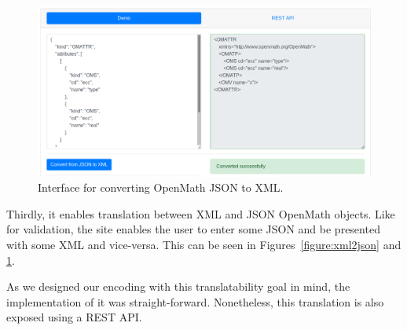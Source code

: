 \begin{figure}
    \centering
        \includegraphics[width=\textwidth]{images/json2xml}
    \caption{Interface for converting OpenMath JSON to XML. }
    \label{figure:json2xml}
\end{figure}

Thirdly, it enables translation between XML and JSON OpenMath objects. 
Like for validation, the site enables the user to enter some JSON and be presented with some XML and vice-versa. 
This can be seen in Figures~\ref{figure:xml2json} and \ref{figure:json2xml}. 

As we designed our encoding with this translatability goal in mind, the implementation of it was straight-forward. 
Nonetheless, this translation is also exposed using a REST API. 

